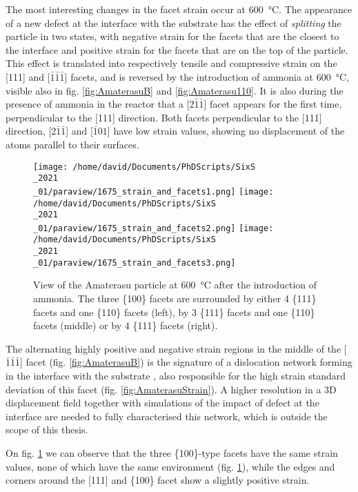 The most interesting changes in the facet strain occur at \qty{600}{\degreeCelsius}.
The appearance of a new defect at the interface with the substrate has the effect of \textit{splitting} the particle in two states, with negative strain for the facets that are the closest to the interface and positive strain for the facets that are on the top of the particle.
This effect is translated into respectively tensile and compressive strain on the [111] and [$\bar{1}\bar{1}\bar{1}$] facets, and is reversed by the introduction of ammonia at \qty{600}{\degreeCelsius}, visible also in fig. \ref{fig:AmaterasuB} and \ref{fig:Amaterasu110}.
It is also during the presence of ammonia in the reactor that a [2$\bar{1}\bar{1}$] facet appears for the first time, perpendicular to the [111] direction.
Both facets perpendicular to the [111] direction, [2$\bar{1}\bar{1}$] and [$\bar{1}01$] have low strain values, showing no displacement of the atoms parallel to their surfaces.

\begin{figure}[!htb]
    \centering
    \texttt{[image: /home/david/Documents/PhDScripts/SixS\\\_2021\\\_01/paraview/1675\_strain\_and\_facets1.png]}
    \texttt{[image: /home/david/Documents/PhDScripts/SixS\\\_2021\\\_01/paraview/1675\_strain\_and\_facets2.png]}
    \texttt{[image: /home/david/Documents/PhDScripts/SixS\\\_2021\\\_01/paraview/1675\_strain\_and\_facets3.png]}
    \caption{
        View of the Amaterasu particle at \qty{600}{\degreeCelsius} after the introduction of ammonia.
        The three \{100\} facets are surrounded by either 4 \{111\} facets and one \{110\} facets (left), by 3 \{111\} facets and one \{110\} facets (middle) or by 4 \{111\} facets (right).
    }
    \label{fig:AmaterasuStrain1675}
\end{figure}

The alternating highly positive and negative strain regions in the middle of the [$\bar{1}\bar{1}\bar{1}$] facet (fig. \ref{fig:AmaterasuB}) is the signature of a dislocation network forming in the interface with the substrate \parencite{Dupraz2015}, also responsible for the high strain standard deviation of this facet (fig. \ref{fig:AmaterasuStrain}).
A higher resolution in a 3D displacement field together with simulations of the impact of defect at the interface are needed to fully characterised this network, which is outside the scope of this thesis.

On fig. \ref{fig:AmaterasuStrain1675} we can observe that the three \{100\}-type facets have the same strain values, none of which have the same environment (fig. \ref{fig:AmaterasuStrain1675}), while the edges and corners around the [111] and \{100\} facet show a slightly positive strain.

